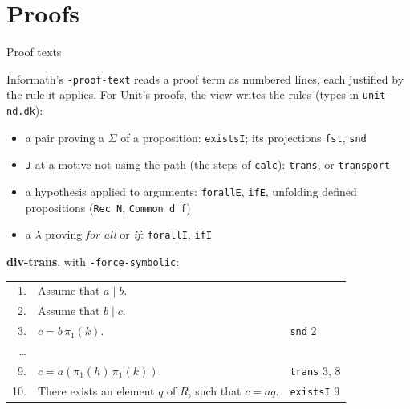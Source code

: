 \documentclass[10pt,aspectratio=169]{beamer}
\newcommand{\file}[1]{\texttt{#1}}
\begin{document}
\section{Proofs}

\begin{frame}{Proof texts}

\footnotesize
Informath's \texttt{-proof-text} reads a proof term as numbered lines,
each justified by the rule it applies. For Unit's proofs, the view writes
the rules (types in \file{unit-nd.dk}):

\begin{itemize}
\item a pair proving a $\Sigma$ of a proposition: \texttt{existsI}; its
  projections \texttt{fst}, \texttt{snd}
\item \texttt{J} at a motive not using the path (the steps of
  \texttt{calc}): \texttt{trans}, or \texttt{transport}
\item a hypothesis applied to arguments: \texttt{forallE}, \texttt{ifE},
  unfolding defined propositions (\texttt{Rec N}, \texttt{Common d f})
\item a $\lambda$ proving \emph{for all} or \emph{if}: \texttt{forallI},
  \texttt{ifI}
\end{itemize}

\textbf{div-trans}, with \texttt{-force-symbolic}:

\begin{tabular}{rll}
1. & Assume that $a\mid b$. & \\
2. & Assume that $b\mid c$. & \\
3. & $c = b\,\pi_1(k)$. & \texttt{snd} 2 \\
\ldots \\
9. & $c = a(\pi_1(h)\,\pi_1(k))$. & \texttt{trans} 3, 8 \\
10. & There exists an element $q$ of $R$, such that $c = aq$. & \texttt{existsI} 9 \\
\end{tabular}

\end{frame}
\end{document}
